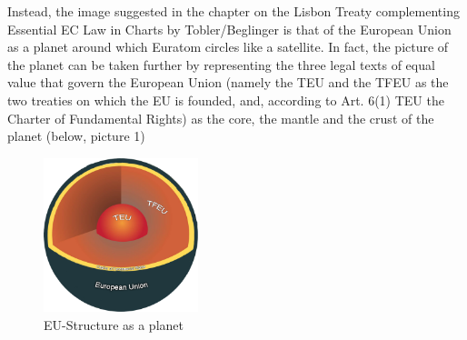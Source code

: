Instead, the image suggested in the chapter on the Lisbon Treaty complementing Essential EC Law in Charts by Tobler/Beglinger is that of the European Union as a planet around which Euratom circles like a satellite. In fact, the picture of the planet can be taken further by representing the three legal texts of equal value that govern the European Union (namely the TEU and the TFEU as the two treaties on which the EU is founded, and, according to Art. 6(1) TEU the Charter of Fundamental Rights) as the core, the mantle and the crust of the planet (below, picture 1)

\begin{figure}[h]
\caption{EU-Structure as a planet}
\centering
\includegraphics[width=0.4\textwidth]{images/struktur.png}
\end{figure}
\clearpage